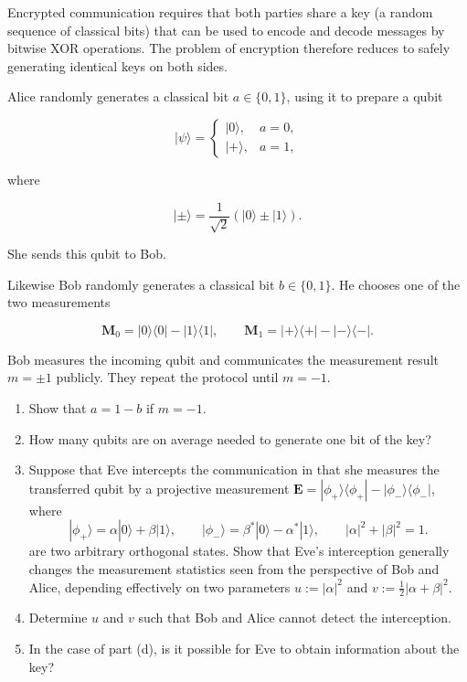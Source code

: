 \begin{Problem}
	
	Encrypted communication requires that both parties share a key (a random
	sequence of classical bits) that can be used to encode and decode messages
	by bitwise XOR operations.
	The problem of encryption therefore reduces to safely generating identical
	keys on both sides.
	
	Alice randomly generates a classical bit
	$a\in\{0,1\}$,
	using it to prepare a qubit
	
	\[
	|\psi\rangle
	=
	\begin{cases}
		|0\rangle,&a=0,\\
		|+\rangle,&a=1,
	\end{cases}
	\]
	
	where
	
	\[
	|\pm\rangle
	=
	\frac1{\sqrt2}(|0\rangle\pm|1\rangle).
	\]
	
	She sends this qubit to Bob.
	
	Likewise Bob randomly generates a classical bit
	$b\in\{0,1\}$.
	He chooses one of the two measurements
	
	\[
	\mathbf{M}_0
	=
	|0\rangle\langle0|
	-
	|1\rangle\langle1|,
	\qquad
	\mathbf{M}_1
	=
	|+\rangle\langle+|
	-
	|-\rangle\langle-|.
	\]
	
	Bob measures the incoming qubit and communicates the measurement result
	$m=\pm1$ publicly.
	They repeat the protocol until $m=-1$.
	
	\begin{enumerate}
		\item[(a)]
		Show that
		$a=1-b$
		if $m=-1$.
		
		\item[(b)]
		How many qubits are on average needed to generate one bit of the key?
		
		\item[(c)]
	Suppose that Eve intercepts the communication in that she measures the transferred qubit by a projective measurement $\mathbf{E}=|\phi_+\rangle\langle\phi_+|
		-
		|\phi_-\rangle\langle\phi_-|$, where
		\[
		|\phi_+\rangle
		=
		\alpha|0\rangle+\beta|1\rangle,\qquad
		|\phi_-\rangle
		=
		\beta^*|0\rangle-\alpha^*|1\rangle,\qquad
		|\alpha|^2+|\beta|^2=1.
		\]
are two arbitrary orthogonal states. Show that Eve’s interception generally changes the measurement statistics seen from the perspective of Bob and Alice, depending effectively on two parameters  
$
		u:=|\alpha|^2$ and $v:=\frac12|\alpha+\beta|^2$.
		
		\item[(d)]
		Determine $u$ and $v$ such that Bob and Alice cannot detect the
		interception.
		
		\item[(e)]
		In the case of part (d), is it possible for Eve to obtain information
		about the key?
		
	\end{enumerate}
\end{Problem}
